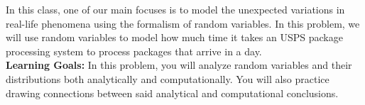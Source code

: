 \documentclass{harvardml}
\theoremstyle{definition}
\theoremstyle{plain}
\begin{document}
\color{black}

\begin{problem}
In this class, one of our main focuses is to model the unexpected variations in real-life phenomena using the formalism of random variables. In this problem, we will use random variables to model how much time it takes an USPS package processing system to process packages that arrive in a day.\\

\noindent \textbf{Learning Goals:} In this problem, you will analyze random variables and their distributions both analytically and computationally. You will also practice drawing connections between said analytical and computational conclusions.\\


\end{problem}
\end{document}
